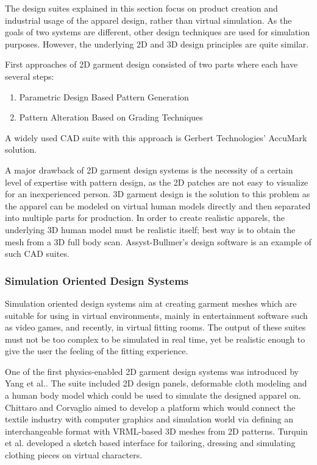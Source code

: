   The design suites explained in this section focus on product creation and industrial usage of the apparel design, rather than virtual simulation. 
  As the goals of two systems are different, other design techniques are used for simulation purposes. However, the underlying 2D and 3D design principles 
  are quite similar.
  
  First approaches of 2D garment design consisted of two parts where each have several steps\cite{Yang2007}:  
 
 \begin{enumerate}
\item Parametric Design Based Pattern Generation
\item Pattern Alteration Based on Grading Techniques
\end{enumerate}    
 
 A widely used CAD suite with this approach is Gerbert Technologies' AccuMark solution\cite{Gerbert2013}. 
 
 A major drawback of 2D garment design systems is the necessity of a certain level of expertise with pattern design, as the 2D patches are not easy to visualize 
 for an inexperienced person. 3D garment design is the solution to this problem as the apparel can be modeled on virtual human models directly and then separated 
 into multiple parts for production. In order to create realistic apparels, the underlying 3D human model must be realistic itself; best way is to obtain the mesh 
 from a 3D full body scan. Assyst-Bullmer's design software is an example of such CAD suites\cite{Assyst2013}. 
 
\subsubsection{Simulation Oriented Design Systems} 
 
 Simulation oriented design systems aim at creating garment meshes which are suitable for using in virtual environments, mainly in entertainment software such 
 as video games, and recently, in virtual fitting rooms. The output of these suites must not be too complex to be simulated in real time, yet be realistic enough
 to give the user the feeling of the fitting experience.
 
 One of the first physics-enabled 2D garment design systems was introduced by Yang et al.\cite{Yang1992}. The suite included 2D design panels, deformable cloth modeling and
 a human body model which could be used to simulate the designed apparel on. Chittaro and Corvaglio\cite{Chittaro2003} aimed to develop a platform which would connect
 the textile industry with computer graphics and simulation world via defining an interchangeable format with VRML-based 3D meshes from 2D patterns. 
 Turquin et al. developed a sketch based interface for tailoring, dressing and simulating clothing pieces on virtual characters\cite{Turquin2007}.
 
